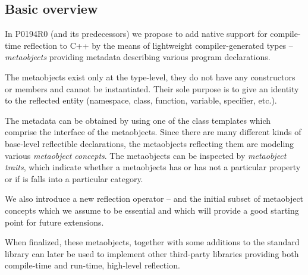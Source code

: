 \subsection{Basic overview}

In P0194R0 (and its predecessors) we propose to add native support for
compile-time reflection to C++ by the means of lightweight compiler-generated
types -- {\em metaobjects} providing metadata describing various program
declarations.

The metaobjects exist only at the type-level, they do not have any constructors
or members and cannot be instantiated. Their sole purpose is to give an identity
to the reflected entity (namespace, class, function, variable, specifier, etc.).

The metadata can be obtained by using one of the class templates which comprise
the interface of the metaobjects. Since there are many different kinds of
base-level reflectible declarations, the metaobjects reflecting them are
modeling various {\em metaobject concepts}. The metaobjects can be inspected
by {\em metaobject traits}, which indicate whether a metaobjects has or has
not a particular property or if is falls into a particular category.

We also introduce a new reflection operator -- \verb@reflexpr@ and the initial subset
of metaobject concepts which we assume to be essential
and which will provide a good starting point for future extensions.

When finalized, these metaobjects, together with some additions to the standard
library can later be used to implement other third-party libraries
providing both compile-time and run-time, high-level reflection.

